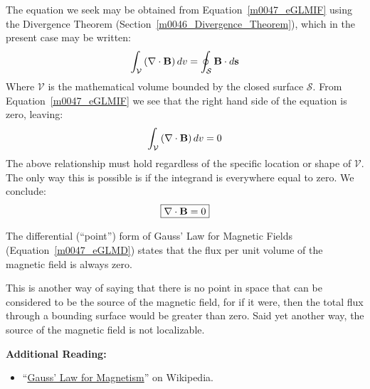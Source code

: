The equation we seek may be obtained from Equation~\ref{m0047_eGLMIF} using the Divergence Theorem 
(Section~\ref{m0046_Divergence_Theorem}), which in the present case may be written:
%
\begin{equation}
\int_{\mathcal V} \left( \nabla \cdot {\bf B} \right) dv = \oint_{\mathcal S} {\bf B}\cdot d{\bf s}
\end{equation}
%
Where ${\mathcal V}$ is the mathematical volume bounded by the closed surface ${\mathcal S}$.
From Equation~\ref{m0047_eGLMIF} we see that the right hand side of the equation is zero, leaving:
%
\begin{equation}
\int_{\mathcal V} \left( \nabla \cdot {\bf B} \right) dv = 0
\end{equation}
%
The above relationship must hold regardless of the specific location or shape of ${\mathcal V}$.  The only way this is possible is if the integrand is everywhere equal to zero.  We conclude:
%
\begin{equation}
\boxed{
\nabla \cdot {\bf B}=0
}
\label{m0047_eGLMD}
\end{equation}
%
\begin{mdframed}[backgroundcolor=yellow!20,nobreak=true] 
The differential (``point'') form of Gauss' Law for Magnetic Fields (Equation~\ref{m0047_eGLMD}) states that the flux per unit volume of the magnetic field is always zero.
\end{mdframed}
%
This is another way of saying that there is no point in space that can be considered to be the source of the magnetic field, for if it were, then the total flux through a bounding surface would be greater than zero. 
Said yet another way, the source of the magnetic field is not localizable.




{\bf Additional Reading:}
\begin{itemize}
\item ``\href{https://en.wikipedia.org/wiki/Gauss'_law_for_magnetism}{Gauss' Law for Magnetism}'' on Wikipedia.
\end{itemize}



